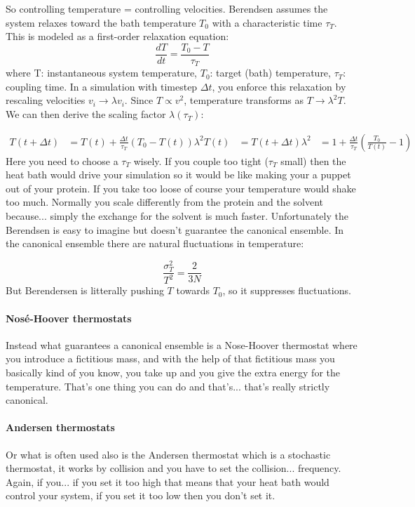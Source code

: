 So controlling temperature = controlling velocities.
Berendsen assumes the system relaxes toward the bath temperature $T_0$ with a characteristic time $\tau_T$. This is modeled as a first-order relaxation equation:
$$
\frac{dT}{dt} = \frac{T_0 - T}{\tau_T}
$$
where  T: instantaneous system temperature, $T_0$: target (bath) temperature, $\tau_T$: coupling time. In a simulation with timestep $\Delta t$, you enforce this relaxation by rescaling velocities $v_i \rightarrow \lambda v_i$.
Since $T \propto v^2$, temperature transforms as $T \rightarrow \lambda^2 T$. We can then derive the scaling factor $\lambda(\tau_T)$:

\begin{align}
    T(t+\Delta t) &= T(t) + \frac{\Delta t}{\tau_T} (T_0 - T(t))
    \lambda^2 T(t) &= T(t+\Delta t)
    \lambda^2 &= 1 + \frac{\Delta t}{\tau_T}\left(\frac{T_0}{T(t)} - 1\right)
\end{align}
Here you need to choose a $\tau_T$ wisely. If you couple too tight ($\tau_T$ small) then the heat bath would drive your simulation so it would be like making your a puppet out of your protein. If you take too loose of course your temperature would shake too much.
Normally you scale differently from the protein and the solvent because... simply the exchange for the solvent is much faster. 
Unfortunately the Berendsen is easy to imagine but doesn't guarantee the canonical ensemble. In the canonical ensemble there are natural fluctuations in temperature:

$$
\frac{\sigma_T^2}{T^2} = \frac{2}{3N}
$$
But Berendersen is litterally pushing $T$ towards $T_0$, so it suppresses fluctuations.

\paragraph{Nosé-Hoover thermostats}
Instead what guarantees a canonical ensemble is a Nose-Hoover thermostat where you introduce a fictitious mass, and with the help of that fictitious mass you basically kind of you know, you take up and you give the extra energy for the temperature. That's one thing you can do and that's... that's really strictly canonical.

\paragraph{Andersen thermostats}
Or what is often used also is the Andersen thermostat which is a stochastic thermostat, it works by collision and you have to set the collision... frequency. Again, if you... if you set it too high that means that your heat bath would control your system, if you set it too low then you don't set it.
